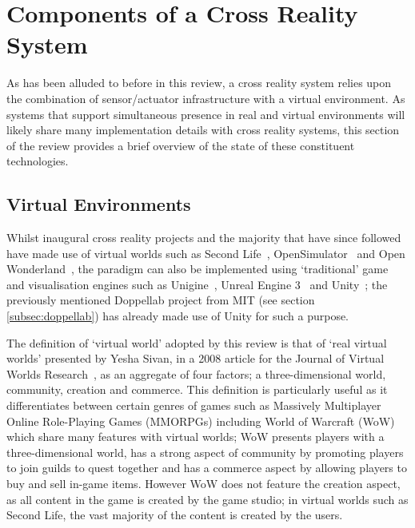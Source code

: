\section{Components of a Cross Reality System}
As has been alluded to before in this review, a cross reality system relies upon the combination of sensor/actuator infrastructure with a virtual environment. As systems that support simultaneous presence in real and virtual environments will likely share many implementation details with cross reality systems, this section of the review provides a brief overview of the state of these constituent technologies.

\subsection{Virtual Environments}
\label{subsec:virtual_environments}
Whilst inaugural cross reality projects and the majority that have since followed have made use of virtual worlds such as Second Life~\cite{LindenResearchInc.}, OpenSimulator~\cite{OpenSimulatorProject} and Open Wonderland~\cite{OpenWonderlandFoundation}, the paradigm can also be implemented using `traditional' game and visualisation engines such as Unigine~\cite{UnigineCorp}, Unreal Engine 3~\cite{EpicGames} and Unity~\cite{UnityTechnologies}; the previously mentioned Doppellab project from MIT (see section \ref{subsec:doppellab}) has already made use of Unity for such a purpose.

The definition of `virtual world' adopted by this review is that of `real virtual worlds' presented by Yesha Sivan, in a 2008 article for the Journal of Virtual Worlds Research~\cite{Sevan2008}, as an aggregate of four factors; a three-dimensional world, community, creation and commerce. This definition is particularly useful as it differentiates between certain genres of games such as Massively Multiplayer Online Role-Playing Games (MMORPGs) including World of Warcraft (WoW) which share many features with virtual worlds; WoW presents players with a three-dimensional world, has a strong aspect of community by promoting players to join guilds to quest together and has a commerce aspect by allowing players to buy and sell in-game items. However WoW does not feature the creation aspect, as all content in the game is created by the game studio; in virtual worlds such as Second Life, the vast majority of the content is created by the users.

